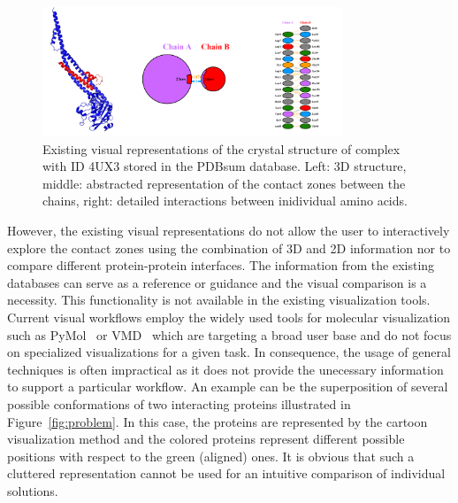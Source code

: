 \documentclass[11pt,a4paper,titlepage,oneside,onecolumn]{article}
\begin{document}
\begin{figure}[h]
  \centering
  \includegraphics[width=0.8\textwidth]{pics/pdbsum2.png}
  \caption{Existing visual representations of the crystal structure of complex with ID 4UX3 stored in the PDBsum database. Left: 3D structure, middle: abstracted representation of the contact zones between the chains, right: detailed interactions between inidividual amino acids.}
  \label{fig:pdbsum}
\end{figure}

However, the existing visual representations do not allow the user to interactively explore the contact zones using the combination of 3D and 2D information nor to compare different protein-protein interfaces.
The information from the existing databases can serve as a reference or guidance and the visual comparison is a necessity.
This functionality is not available in the existing visualization tools.
Current visual workflows employ the widely used tools for molecular visualization such as PyMol~\cite{pymol} or VMD~\cite{VMD} which are targeting a broad user base and do not focus on specialized visualizations for a given task.
In consequence, the usage of general techniques is often impractical as it does not  provide the unecessary information to support a particular workflow.
An example can be the superposition of several possible conformations of two interacting proteins illustrated in Figure~\ref{fig:problem}.
In this case, the proteins are represented by the cartoon visualization method and the colored proteins represent different possible positions with respect to the green (aligned) ones.
It is obvious that such a cluttered representation cannot be used for an intuitive comparison of individual solutions.
\end{document}
